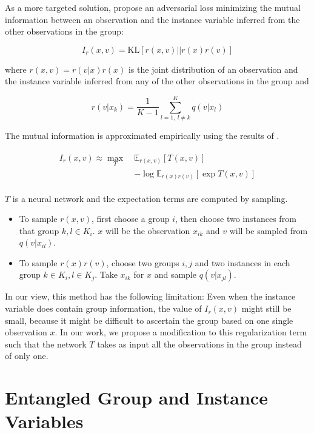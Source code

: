 \documentclass[nohyperref]{article}
\theoremstyle{plain}
\theoremstyle{definition}
\theoremstyle{remark}
\begin{document}
As a more targeted solution, \citet{Hosoya2019GroupbasedLO} propose an adversarial loss minimizing the mutual information between an observation and the instance variable inferred from the other observations in the group:

$$I_{r} (x, v) = \mathrm{KL} [r(x, v) || r(x) r(v)]$$

where $r(x, v) = r(v | x) r(x)$ is the joint distribution of an observation and the instance variable inferred from any of the other observations in the group and 

$$r(v | x_k) = \frac{1}{K - 1} \sum_{l=1, ~ l \neq k}^K q(v | x_l)$$

The mutual information is approximated empirically using the results of \citet{Belghazi2018MutualIN}.

\begin{align}
\begin{split}
I_{r} (x, v) \approx \max_{T} ~ &\mathbb{E}_{r(x, v)} [T(x, v)] \\ &- \log \mathbb{E}_{r(x)r(v)} [\exp T(x, v)] 
\end{split}
\end{align}

$T$ is a neural network and the expectation terms are computed by sampling.

\begin{itemize}
    \item To sample $r(x, v)$, first choose a group $i$, then choose two instances from that group $k, l \in K_i$. $x$ will be the observation $x_{ik}$ and $v$ will be sampled from $q(v | x_{il})$.
    \item To sample $r(x)r(v)$, choose two groups $i, j$ and two instances in each group $k \in K_i, l \in K_j$. Take $x_{ik}$ for $x$ and sample $q(v | x_{jl})$.
\end{itemize}

In our view, this method has the following limitation: Even when the instance variable does contain group information, the value of $I_{r} (x, v)$ might still be small, because it might be difficult to ascertain the group based on one single observation $x$. In our work, we propose a modification to this regularization term such that the network $T$ takes as input all the observations in the group instead of only one.

\section{Entangled Group and Instance Variables}
\end{document}

